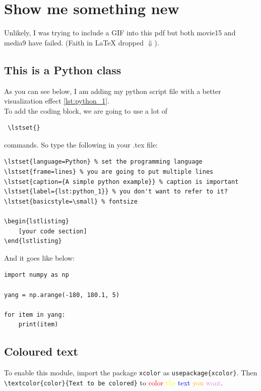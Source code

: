 \documentclass[14pt, letterpaper]{article}
\begin{document}
\section{Show me something new}
Unlikely, I was trying to include a GIF into this pdf but both movie15 and media9 have failed. (Faith in \LaTeX 
dropped $\Downarrow$). %
\subsection{This is a Python class}
As you can see below, I am adding my python script file with a better visualization effect \ref{lst:python_1}.\\
To add the coding block, we are going to use a lot of \begin{verbatim} \lstset{} \end{verbatim} commands. 
So type the following in your .tex file: \\

\nolinenumbers
\begin{verbatim}
\lstset{language=Python} % set the programming language
\lstset{frame=lines} % you are going to put multiple lines
\lstset{caption={A simple python example}} % caption is important
\lstset{label={lst:python_1}} % you don't want to refer to it?
\lstset{basicstyle=\small} % fontsize

\begin{lstlisting}
	[your code section]
\end{lstlisting}
\end{verbatim}
\linenumbers
And it goes like below: 
\lstset{language=Python}
\lstset{frame=lines}
\lstset{basicstyle=\small}
\begin{lstlisting}
import numpy as np

yang = np.arange(-180, 180.1, 5)

for item in yang:
	print(item)
\end{lstlisting}

\subsection{Coloured text}
To enable this module, import the package \texttt{xcolor} as 
\verb+usepackage{xcolor}+. %
Then \verb+\textcolor{color}{Text to be colored}+ to \textcolor{red}{color} \textcolor{yellow}{the} 
\textcolor{blue}{text} \textcolor{orange}{you} \textcolor{violet}{want}. \\
\end{document}
